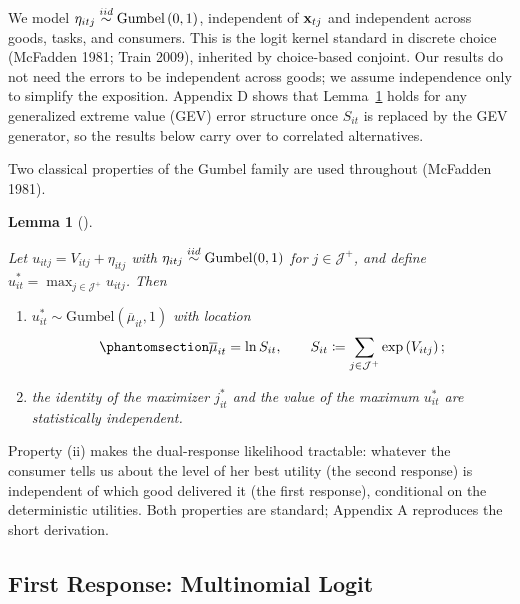 \documentclass[
  letterpaper,
  DIV=11,
  numbers=noendperiod]{scrartcl}
\theoremstyle{plain}
\newtheorem{lemma}{Lemma}[section]
\theoremstyle{plain}
\theoremstyle{plain}
\theoremstyle{remark}
\begin{document}
We model \(\eta_{itj} \stackrel{iid}{\sim} \text{Gumbel} \left( 0,1 \right)\),
independent of \(\mathbf{x}_{tj}\) and independent across goods, tasks, and
consumers. This is the logit kernel standard in discrete choice
(McFadden 1981; Train 2009), inherited by choice-based conjoint. Our
results do not need the errors to be independent across goods; we assume
independence only to simplify the exposition. Appendix D shows that
Lemma~\ref{lem-gumbel} holds for any generalized extreme value (GEV)
error structure once \(S_{it}\) is replaced by the GEV generator, so the
results below carry over to correlated alternatives.

Two classical properties of the Gumbel family are used throughout
(McFadden 1981).

\begin{lemma}[]\protect\hypertarget{lem-gumbel}{}\label{lem-gumbel}

Let \(u_{itj} = V_{itj} + \eta_{itj}\) with
\(\eta_{itj} \stackrel{iid}{\sim} \text{Gumbel}(0,1)\) for \(j \in \mathcal{J}^+\), and
define \(u^*_{it} = \max_{j \in \mathcal{J}^+} u_{itj}\). Then

\begin{enumerate}
\def\labelenumi{(\roman{enumi})}
\item
  \(u^*_{it} \sim \text{Gumbel}\left(\overline{\mu}_{it}, 1\right)\)
  with location
  \begin{equation}\protect\phantomsection\label{eq-max-mu}{
  \overline{\mu}_{it} = \ln S_{it},
  \qquad
  S_{it} \coloneqq \sum_{j\in\mathcal{J}^{+}} \exp \left( V_{itj} \right);
  }\end{equation}
\item
  the identity of the maximizer \(j^*_{it}\) and the value of the
  maximum \(u^*_{it}\) are statistically independent.
\end{enumerate}

\end{lemma}

Property (ii) makes the dual-response likelihood tractable: whatever the
consumer tells us about the level of her best utility (the second
response) is independent of which good delivered it (the first
response), conditional on the deterministic utilities. Both properties
are standard; Appendix A reproduces the short derivation.

\subsection{First Response: Multinomial
Logit}\label{first-response-multinomial-logit}
\end{document}
